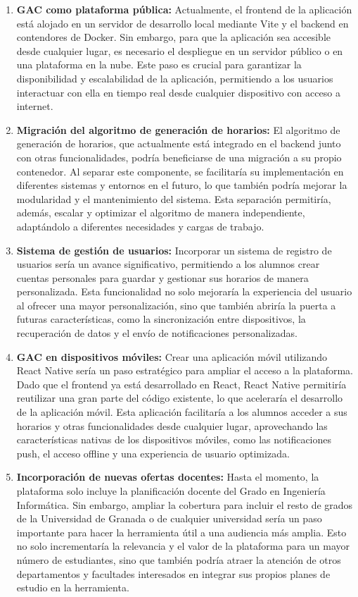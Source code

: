 \begin{enumerate}
    \item \textbf{GAC como plataforma pública:} Actualmente, el frontend de la aplicación está alojado en un servidor de desarrollo local mediante Vite y el backend en contendores de Docker. Sin embargo, para que la aplicación sea accesible desde cualquier lugar, es necesario el despliegue en un servidor público o en una plataforma en la nube. Este paso es crucial para garantizar la disponibilidad y escalabilidad de la aplicación, permitiendo a los usuarios interactuar con ella en tiempo real desde cualquier dispositivo con acceso a internet.
    
    \item \textbf{Migración del algoritmo de generación de horarios:} El algoritmo de generación de horarios, que actualmente está integrado en el backend junto con otras funcionalidades, podría beneficiarse de una migración a su propio contenedor. Al separar este componente, se facilitaría su implementación en diferentes sistemas y entornos en el futuro, lo que también podría mejorar la modularidad y el mantenimiento del sistema. Esta separación permitiría, además, escalar y optimizar el algoritmo de manera independiente, adaptándolo a diferentes necesidades y cargas de trabajo.

    \item \textbf{Sistema de gestión de usuarios:} Incorporar un sistema de registro de usuarios sería un avance significativo, permitiendo a los alumnos crear cuentas personales para guardar y gestionar sus horarios de manera personalizada. Esta funcionalidad no solo mejoraría la experiencia del usuario al ofrecer una mayor personalización, sino que también abriría la puerta a futuras características, como la sincronización entre dispositivos, la recuperación de datos y el envío de notificaciones personalizadas.
    
    \item \textbf{GAC en dispositivos móviles:} Crear una aplicación móvil utilizando React Native sería un paso estratégico para ampliar el acceso a la plataforma. Dado que el frontend ya está desarrollado en React, React Native permitiría reutilizar una gran parte del código existente, lo que aceleraría el desarrollo de la aplicación móvil. Esta aplicación facilitaría a los alumnos acceder a sus horarios y otras funcionalidades desde cualquier lugar, aprovechando las características nativas de los dispositivos móviles, como las notificaciones push, el acceso offline y una experiencia de usuario optimizada.
    
    \item \textbf{Incorporación de nuevas ofertas docentes:} Hasta el momento, la plataforma solo incluye la planificación docente del Grado en Ingeniería Informática. Sin embargo, ampliar la cobertura para incluir el resto de grados de la Universidad de Granada o de cualquier universidad sería un paso importante para hacer la herramienta útil a una audiencia más amplia. Esto no solo incrementaría la relevancia y el valor de la plataforma para un mayor número de estudiantes, sino que también podría atraer la atención de otros departamentos y facultades interesados en integrar sus propios planes de estudio en la herramienta.
\end{enumerate}
